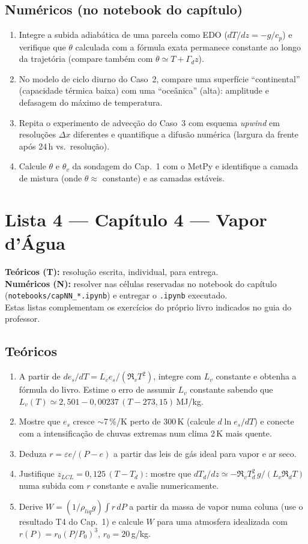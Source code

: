 \documentclass[11pt]{article}
\newcommand{\instrucoes}{%
\begin{caixalista}
\textbf{Teóricos (T):} resolução escrita, individual, para entrega.\\
\textbf{Numéricos (N):} resolver nas células reservadas no notebook do
capítulo (\texttt{notebooks/capNN\_*.ipynb}) e entregar o
\texttt{.ipynb} executado.\\
Estas listas complementam os exercícios do próprio livro indicados no
guia do professor.
\end{caixalista}}
\begin{document}
\subsection*{Numéricos (no notebook do capítulo)}

\begin{enumerate}[label=\textbf{N\arabic*.},itemsep=4pt]
  \item Integre a subida adiabática de uma parcela como EDO
        ($dT/dz = -g/c_p$) e verifique que $\theta$ calculada com a
        fórmula exata permanece constante ao longo da trajetória (compare
        também com $\theta \simeq T+\Gamma_d z$).
  \item No modelo de ciclo diurno do Caso~2, compare uma superfície
        ``continental'' (capacidade térmica baixa) com uma ``oceânica''
        (alta): amplitude e defasagem do máximo de temperatura.
  \item Repita o experimento de advecção do Caso~3 com esquema
        \emph{upwind} em resoluções $\Delta x$ diferentes e quantifique a
        difusão numérica (largura da frente após 24\,h vs.\ resolução).
  \item Calcule $\theta$ e $\theta_v$ da sondagem do Cap.~1 com o MetPy e
        identifique a camada de mistura (onde $\theta \approx$ constante)
        e as camadas estáveis.
\end{enumerate}

\clearpage
\section*{Lista 4 --- Capítulo 4 --- Vapor d'Água}
\instrucoes

\subsection*{Teóricos}

\begin{enumerate}[label=\textbf{T\arabic*.},itemsep=4pt]
  \item A partir de $de_s/dT = L_v e_s/(\Re_v T^2)$, integre com $L_v$
        constante e obtenha a fórmula do livro. Estime o erro de assumir
        $L_v$ constante sabendo que $L_v(T) \simeq 2{,}501 - 0{,}00237\,
        (T-273{,}15)$\,MJ/kg.
  \item Mostre que $e_s$ cresce $\sim$7\,\%/K perto de 300\,K
        (calcule $d\ln e_s/dT$) e conecte com a intensificação de chuvas
        extremas num clima 2\,K mais quente.
  \item Deduza $r = \varepsilon e/(P-e)$ a partir das leis de gás ideal
        para vapor e ar seco.
  \item Justifique $z_{LCL} = 0{,}125\,(T-T_d)$: mostre que
        $dT_d/dz \simeq -\Re_v T_d^2\,g/(L_v \Re_d T)$ numa subida com $r$
        constante e avalie numericamente.
  \item Derive $W = (1/\rho_{liq}g)\int r\,dP$ a partir da massa de vapor
        numa coluna (use o resultado T4 do Cap.~1) e calcule $W$ para uma
        atmosfera idealizada com $r(P) = r_0 (P/P_0)^3$, $r_0 = 20$\,g/kg.
\end{enumerate}
\end{document}

